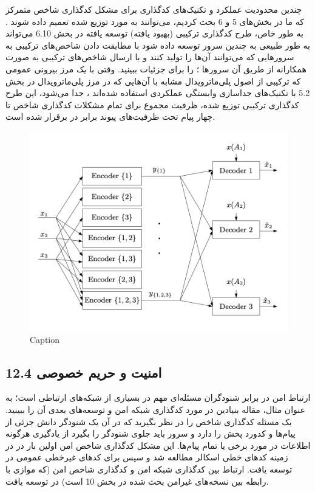 چندین محدودیت عملکرد و تکنیک‌های کدگذاری برای مشکل کدگذاری شاخص متمرکز که ما در بخش‌های 5 و 6 بحث کردیم، می‌توانند به مورد توزیع شده تعمیم داده شوند \lr{[145, 93, 94, 95]}. به طور خاص، طرح کدگذاری ترکیبی (بهبود یافته) توسعه یافته در بخش 6.10 می‌تواند به طور طبیعی به چندین سرور توسعه داده شود با مطابقت دادن شاخص‌های ترکیبی به سرورهایی که می‌توانند آن‌ها را تولید کنند \lr{[94]} و با ارسال شاخص‌های ترکیبی به صورت همکارانه از طریق آن سرورها \lr{[93]}؛ \lr{[95]} را برای جزئیات ببینید. وقتی با یک مرز بیرونی عمومی که ترکیبی از اصول پلی‌ماترویدال مشابه با آن‌هایی که در مرز پلی‌ماترویدال در بخش 5.2 با تکنیک‌های جداسازی وابستگی عملکردی استفاده شده‌اند \lr{[88, 144]}، جدا می‌شود، این طرح کدگذاری ترکیبی توزیع شده، ظرفیت مجموع برای تمام مشکلات کدگذاری شاخص تا چهار پیام تحت ظرفیت‌های پیوند برابر در \lr{[95]} برقرار شده است.
\begin{figure}
	\centering
	\includegraphics{figs/chapter8/12.2.png}
	\caption{Caption}
	\label{fig:my_label}
\end{figure}

\subsection{12.4 امنیت و حریم خصوصی}


ارتباط امن در برابر شنودگران مسئله‌ای مهم در بسیاری از شبکه‌های ارتباطی است؛ به عنوان مثال، مقاله بنیادین \lr{[37]} در مورد کدگذاری شبکه امن و توسعه‌های بعدی آن \lr{[36, 38, 136, 64]} را ببینید. یک مسئله کدگذاری شاخص را در نظر بگیرید که در آن یک شنودگر دانش جزئی از پیام‌ها و کدورد پخش را دارد و سرور باید جلوی شنودگر را بگیرد از یادگیری هرگونه اطلاعات در مورد برخی یا تمام پیام‌ها. این مشکل کدگذاری شاخص امن اولین بار در \lr{[51]} در زمینه کدهای خطی اسکالر مطالعه شد و سپس برای کدهای غیرخطی عمومی در \lr{[118]} توسعه یافت. ارتباط بین کدگذاری شبکه امن و کدگذاری شاخص امن (که موازی با رابطه بین نسخه‌های غیرامن بحث شده در بخش 10 است) در \lr{[117]} توسعه یافت.

